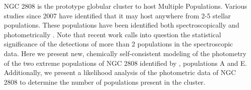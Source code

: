 {\color{blue} NGC 2808 is the prototype globular cluster to host Multiple
Populations.} Various studies since 2007 have identified that it may host
anywhere from 2-5 stellar populations. These populations have been identified
both spectroscopically \citep[i.e.][]{} and photometrically \citep[i.e.][]{}.
Note that recent work \citep{Valle2022} calls into question the statistical significance
of the detections of more than 2 populations in the spectroscopic data. Here we
present new, chemically self-consistent modeling of the photometry of the two extreme populations
of NGC 2808 identified by \citet{Milone2015}, populations A and E.
{\color{blue} Additionally, we present a likelihood analysis of the photometric
data of NGC 2808 to determine the number of populations present in the cluster.}


